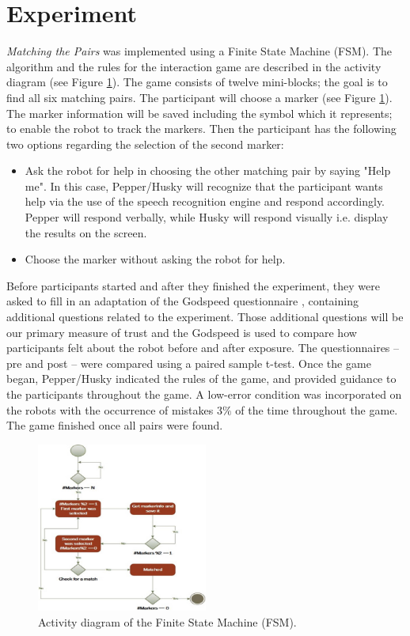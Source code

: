 \documentclass[letterpaper]{article} %
\begin{document}
\section{Experiment}
\textit{Matching the Pairs} was implemented using a Finite State Machine (FSM). The algorithm and the rules for the interaction game are described in the activity diagram (see Figure \ref{pic1}). The game consists of twelve mini-blocks; the goal is to find all six matching pairs. The participant will choose a marker (see Figure \ref{pic1}). The marker information will be saved including the symbol which it represents; to enable the robot to track the markers. Then the participant has the following two options regarding the selection of the second marker:
\begin{itemize}
\item	Ask the robot for help in choosing the other matching pair by saying "Help me". In this case, Pepper/Husky will recognize that the participant wants help via the use of the speech recognition engine and respond accordingly. Pepper will respond verbally, while Husky will respond visually i.e. display the results on the screen.
\item Choose the marker without asking the robot for help.
\end{itemize}
Before participants started and after they finished the experiment, they were asked to fill in an adaptation of the Godspeed questionnaire \cite{bartneck2009measurement}, containing additional questions related to the experiment. Those additional questions will be our primary measure of trust and the Godspeed is used to compare how participants felt about the robot before and after exposure. The questionnaires -- pre and post -- were compared using a paired sample t-test. Once the game began, Pepper/Husky indicated the rules of the game, and provided guidance to the participants throughout the game. A low-error condition was incorporated on the robots with the occurrence of mistakes $3\%$ of the time throughout the game. The game finished once all pairs were found.
\begin{figure}
\includegraphics[width=0.5\textwidth]{Picture1.jpeg}
\caption{Activity diagram of the Finite State Machine (FSM).}
\label{pic1}
\end{figure}
\end{document}
